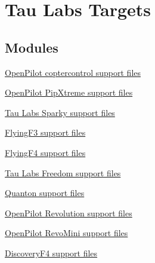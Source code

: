 \hypertarget{group___tau_labs_targets}{\section{\-Tau \-Labs \-Targets}
\label{group___tau_labs_targets}
}
\subsection*{\-Modules}
\begin{DoxyCompactItemize}
\item 
\hyperlink{group___copter_control}{\-Open\-Pilot coptercontrol support files}
\item 
\hyperlink{group___pip_xtreme}{\-Open\-Pilot Pip\-Xtreme support files}
\item 
\hyperlink{group___sparky}{\-Tau Labs Sparky support files}
\item 
\hyperlink{group___flying_f3}{\-Flying\-F3 support files}
\item 
\hyperlink{group___flying_f4}{\-Flying\-F4 support files}
\item 
\hyperlink{group___freedom}{\-Tau Labs Freedom support files}
\item 
\hyperlink{group___quanton}{\-Quanton support files}
\item 
\hyperlink{group___revolution}{\-Open\-Pilot Revolution support files}
\item 
\hyperlink{group___revo_mini}{\-Open\-Pilot Revo\-Mini support files}
\item 
\hyperlink{group___discovery_f4}{\-Discovery\-F4 support files}
\end{DoxyCompactItemize}
